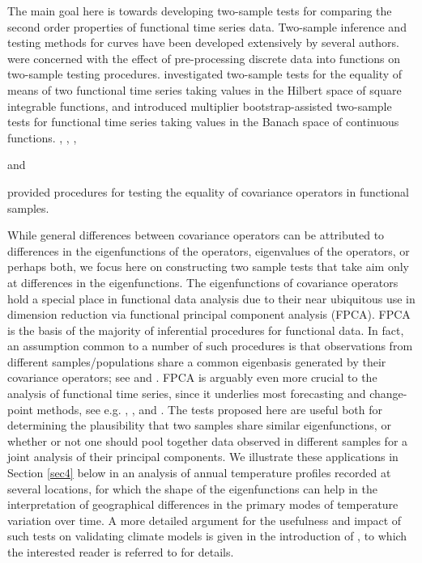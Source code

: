 \documentclass[11pt]{article}
\numberwithin{equation}{section}
\numberwithin{theorem}{section}
\numberwithin{lemma}{section}
\numberwithin{proposition}{section}
\numberwithin{cor}{section}
\numberwithin{definition}{section}
\numberwithin{cons}{section}
\numberwithin{rem}{section}
\numberwithin{exa}{section}
\numberwithin{table}{section}
\numberwithin{figure}{section}
\numberwithin{algo}{section}
\begin{document}
The main goal here is towards developing two-sample tests for comparing the second order properties of functional time series data. Two-sample inference and testing methods for curves have been developed extensively by several authors. \citet{hall:vankeilegom:2007} were concerned with the effect of pre-processing discrete data into functions on two-sample testing procedures. \citet{horvath:kokoszka:reeder:2013} investigated two-sample tests for the equality of means of two functional time series taking values in the Hilbert space of square integrable functions, and \citet{dette:kokot:aue:2019} introduced multiplier bootstrap-assisted two-sample tests for functional time series taking values in the Banach space of continuous functions. \citet{panaretos:2010}, \citet{fremdt:horvath:kokoszka:steinebach:2013}, \citet{pigoli:2014},
{\cite{Paparoditis2016} and  {\cite{Guo2016}  provided procedures for testing the equality of covariance operators in functional samples.


While general differences between covariance operators can be attributed to differences in the eigenfunctions of the operators, eigenvalues of the operators, or perhaps both, we focus here on constructing two sample tests that take aim only at differences in the eigenfunctions. The eigenfunctions of covariance operators hold a special place in functional data analysis due to their near ubiquitous use in dimension reduction via functional principal component analysis (FPCA). FPCA is the basis of the majority of inferential procedures for functional data. In fact, an assumption common to a number of such procedures is that observations from different samples/populations share a common eigenbasis generated by their covariance operators; see \cite{benko:hardle:kneip:2009} and \cite{pomann:2016}. FPCA is arguably even more crucial to the analysis of functional time series, since it underlies most forecasting and change-point methods, see e.g. \cite{aue:dubartnorinho:hormann:2015}, \cite{hyndman:shang:2009}, and \cite{aston:kirch:2012AAS}. The tests proposed here are useful both for determining the plausibility that two samples share similar eigenfunctions, or whether or not one should pool together data observed in different samples for a joint analysis of their principal components.
 We illustrate these applications in Section \ref{sec4} below in an analysis of annual temperature profiles recorded  at several locations, for which the shape of the eigenfunctions can help in the interpretation of geographical differences in the primary modes of temperature variation over time. A more detailed argument for the usefulness and impact of such tests on validating climate models is given in the introduction of \citet{zhangshao2015}, to which the interested reader is referred to for details.

}}
\end{document}
